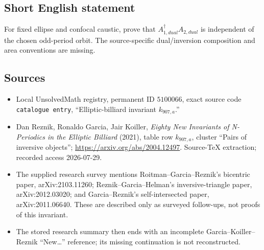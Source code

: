 \documentclass[11pt]{article}
\begin{document}
\subsection{Short English statement}
For fixed ellipse and confocal caustic, prove that \(A_{1,dual}^\dagger A_{2,dual}\) is independent of the chosen odd-period orbit. The source-specific dual/inversion composition and area conventions are missing.
\subsection{Sources}
\begin{itemize}
\item Local UnsolvedMath registry, permanent ID \(5100066\), exact source code \texttt{catalogue entry}, ``Elliptic-billiard invariant \(k_{907,a}\).''
\item Dan Reznik, Ronaldo Garcia, Jair Koiller, \emph{Eighty New Invariants of N-Periodics in the Elliptic Billiard} (2021), table row \(k_{907,a}\), cluster ``Pairs of inversive objects''; \url{https://arxiv.org/abs/2004.12497}. Source-TeX extraction; recorded access 2026-07-29.
\item The supplied research survey mentions Roitman--Garcia--Reznik's bicentric paper, arXiv:2103.11260; Reznik--Garcia--Helman's inversive-triangle paper, arXiv:2012.03020; and Garcia--Reznik's self-intersected paper, arXiv:2011.06640. These are described only as surveyed follow-ups, not proofs of this invariant.
\item The stored research summary then ends with an incomplete Garcia--Koiller--Reznik ``New\ldots'' reference; its missing continuation is not reconstructed.
\end{itemize}
\end{document}
